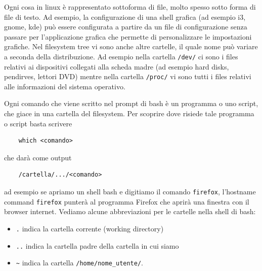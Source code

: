 Ogni cosa in linux è rappresentato sottoforma di file, molto spesso sotto forma di file di testo. Ad esempio, la configurazione di una shell grafica (ad esempio i3, gnome, kde) può essere configurata a partire da un file di configurazione senza passare per l'applicazione grafica che permette di personalizzare le impostazioni grafiche. Nel filesystem tree vi sono anche altre cartelle, il quale nome può variare a seconda della distribuzione. Ad esempio nella cartella \verb"/dev/" ci sono i files relativi ai dispositivi collegati alla scheda madre (ad esempio hard disks, pendirves, lettori DVD) mentre nella cartella \verb"/proc/" vi sono tutti i files relativi alle informazioni del sistema operativo.

Ogni comando che viene scritto nel prompt di bash è un programma o uno script, che giace in una cartella del filesystem. Per scoprire dove risiede tale programma o script basta scrivere
\begin{verbatim}
	which <comando>
\end{verbatim}
che darà come output
\begin{verbatim}
	/cartella/.../<comando>
\end{verbatim}
ad esempio se apriamo un shell bash e digitiamo il comando \verb"firefox", l'hostname command \verb"firefox" punterà al programma Firefox che aprirà una finestra con il browser internet. Vediamo alcune abbreviazioni per le cartelle nella shell di bash:
\begin{itemize}
	\item \verb"." indica la cartella corrente (working directory)
	\item \verb".." indica la cartella padre della cartella in cui siamo 
	\item \verb"~" indica la cartella \verb"/home/nome_utente/".
\end{itemize}

